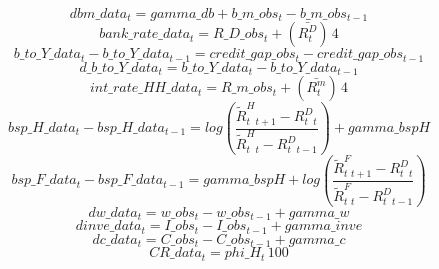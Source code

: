 \begin{dmath}
{dbm\_data_{t}}={gamma\_db}+{b\_m\_obs_{t}}-{b\_m\_obs_{t-1}}
\end{dmath}
\begin{dmath}
{bank\_rate\_data_{t}}={R\_D\_obs_{t}}+(\bar{  R^D_t })\, 4
\end{dmath}
\begin{dmath}
{b\_to\_Y\_data_{t}}-{b\_to\_Y\_data_{t-1}}={credit\_gap\_obs_{t}}-{credit\_gap\_obs_{t-1}}
\end{dmath}
\begin{dmath}
{d\_b\_to\_Y\_data_{t}}={b\_to\_Y\_data_{t}}-{b\_to\_Y\_data_{t-1}}
\end{dmath}
\begin{dmath}
{int\_rate\_HH\_data_{t}}={R\_m\_obs_{t}}+(\bar{  R^m_t })\, 4
\end{dmath}
\begin{dmath}
{bsp\_H\_data_{t}}-{bsp\_H\_data_{t-1}}=log\left(\frac{{  \tilde{R}^H_t _{t+1}}-{  R^D_t _{t}}}{{  \tilde{R}^H_t _{t}}-{  R^D_t _{t-1}}}\right)+{gamma\_bspH}
\end{dmath}
\begin{dmath}
{bsp\_F\_data_{t}}-{bsp\_F\_data_{t-1}}={gamma\_bspH}+log\left(\frac{{  \tilde{R}^F_t _{t+1}}-{  R^D_t _{t}}}{{  \tilde{R}^F_t _{t}}-{  R^D_t _{t-1}}}\right)
\end{dmath}
\begin{dmath}
{dw\_data_{t}}={w\_obs_{t}}-{w\_obs_{t-1}}+{gamma\_w}
\end{dmath}
\begin{dmath}
{dinve\_data_{t}}={I\_obs_{t}}-{I\_obs_{t-1}}+{gamma\_inve}
\end{dmath}
\begin{dmath}
{dc\_data_{t}}={C\_obs_{t}}-{C\_obs_{t-1}}+{gamma\_c}
\end{dmath}
\begin{dmath}
{CR\_data_{t}}={phi\_H_{t}}\, 100
\end{dmath}
